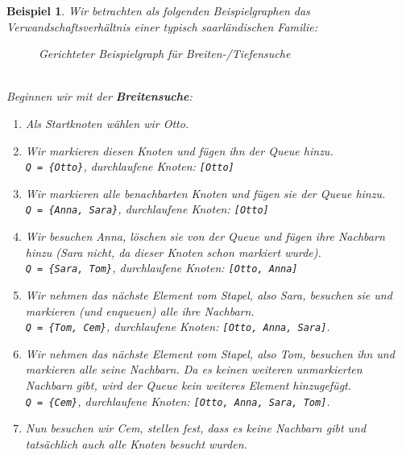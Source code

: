 \documentclass[11pt,a4paper]{scrartcl}
\newtheorem{example}{Beispiel}
\begin{document}
\begin{example}
Wir betrachten als folgenden Beispielgraphen das Verwandschaftsverhältnis einer typisch saarländischen Familie: \\
\begin{figure}[h]
\centering
{}
\caption{Gerichteter Beispielgraph für Breiten-/Tiefensuche}
\end{figure} \\
Beginnen wir mit der \textbf{Breitensuche}:
\begin{enumerate}
\item Als Startknoten wählen wir {\glqq}Otto{\grqq}.
\item Wir markieren diesen Knoten und fügen ihn der Queue hinzu. \\
\texttt{Q = \{Otto\}}, durchlaufene Knoten: \texttt{[Otto]}
\item Wir markieren alle benachbarten Knoten und fügen sie der Queue hinzu. \\
\texttt{Q = \{Anna, Sara\}}, durchlaufene Knoten: \texttt{[Otto]}
\item Wir besuchen Anna, löschen sie von der Queue und fügen ihre Nachbarn hinzu (Sara nicht, da dieser Knoten schon markiert wurde). \\
\texttt{Q = \{Sara, Tom\}}, durchlaufene Knoten: \texttt{[Otto, Anna]}
\item Wir nehmen das nächste Element vom Stapel, also Sara, besuchen sie und markieren (und enqueuen) alle ihre Nachbarn. \\
\texttt{Q = \{Tom, Cem\}}, durchlaufene Knoten: \texttt{[Otto, Anna, Sara]}.
\item Wir nehmen das nächste Element vom Stapel, also Tom, besuchen ihn und markieren alle seine Nachbarn. Da es keinen weiteren unmarkierten Nachbarn gibt, wird der Queue kein weiteres Element hinzugefügt. \\
\texttt{Q = \{Cem\}}, durchlaufene Knoten: \texttt{[Otto, Anna, Sara, Tom]}.
\item Nun besuchen wir Cem, stellen fest, dass es keine Nachbarn gibt und tatsächlich auch alle Knoten besucht wurden. \\

\end{enumerate}
\end{example}
\end{document}
